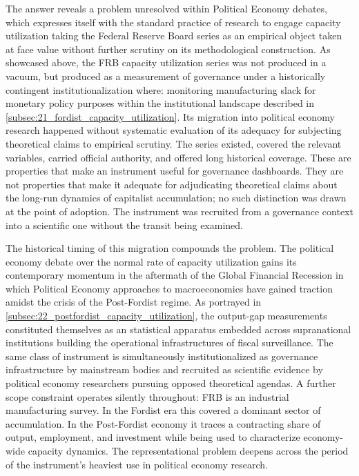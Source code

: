 \documentclass[11pt,a4paper]{article}
\begin{document}
The answer reveals a problem unresolved within Political Economy debates, which expresses itself with the standard practice of research to engage capacity utilization taking the Federal Reserve Board series as an empirical
object taken at face value without further scrutiny on its methodological construction. As showcased above, the FRB capacity utilization series was not produced in a vacuum, but produced as a measurement of governance under a historically contingent institutionalization where: monitoring manufacturing slack for monetary policy purposes within the institutional landscape described in \ref{subsec:21_fordist_capacity_utilization}. Its migration into political economy research happened without systematic evaluation of its adequacy for subjecting theoretical claims to empirical scrutiny. The series existed, covered the relevant variables, carried official
authority, and offered long historical coverage. These are properties that make an instrument useful for governance dashboards. They are not properties that make it adequate for adjudicating theoretical claims about the long-run dynamics of capitalist accumulation; no such distinction was drawn at the point of adoption. The instrument was
recruited from a governance context into a scientific one without the transit being examined.

The historical timing of this migration compounds the problem. The political economy debate over the normal rate of capacity utilization gains its contemporary momentum in the aftermath of the Global Financial Recession in which Political Economy approaches to macroeconomics have gained traction amidst the crisis of the Post-Fordist regime. As portrayed in \ref{subsec:22_postfordist_capacity_utilization}, the output-gap measurements constituted themselves as an statistical apparatus embedded across supranational institutions building the operational infrastructures of fiscal surveillance.  The same class of instrument is simultaneously institutionalized as governance infrastructure by mainstream bodies and recruited as scientific evidence by political economy researchers pursuing opposed theoretical agendas. A further scope constraint operates silently throughout: FRB is an industrial manufacturing survey. In the Fordist era this covered a dominant sector of accumulation. In the Post-Fordist economy it traces a contracting share of output, employment, and investment while being used to characterize economy-wide capacity dynamics. The representational problem deepens across the period of the instrument's heaviest use in political economy research.
\end{document}
